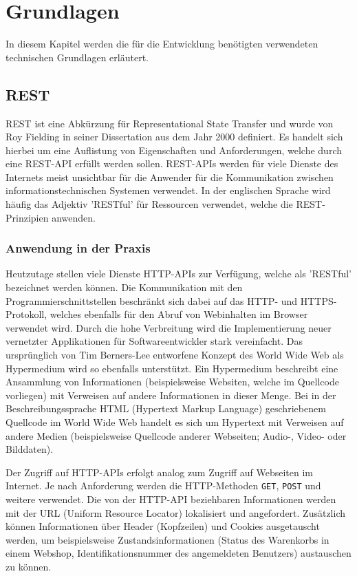 \chapter{Grundlagen}
\label{cha:grundlagen}

In diesem Kapitel werden die für die Entwicklung benötigten verwendeten technischen Grundlagen erläutert.

\section{REST}

REST ist eine Abkürzung für Representational State Transfer und wurde von Roy Fielding in seiner Dissertation aus dem Jahr 2000 \cite{rest} definiert. Es handelt sich hierbei um eine Auflistung von Eigenschaften und Anforderungen, welche durch eine REST-API erfüllt werden sollen. REST-APIs werden für viele Dienste des Internets meist unsichtbar für die Anwender für die Kommunikation zwischen informationstechnischen Systemen verwendet. In der englischen Sprache wird häufig das Adjektiv 'RESTful' für Ressourcen verwendet, welche die REST-Prinzipien anwenden.

\subsection{Anwendung in der Praxis}

Heutzutage stellen viele Dienste HTTP-APIs zur Verfügung, welche als 'RESTful' bezeichnet werden können. Die Kommunikation mit den Programmierschnittstellen beschränkt sich dabei auf das HTTP- und HTTPS-Protokoll, welches ebenfalls für den Abruf von Webinhalten im Browser verwendet wird. Durch die hohe Verbreitung wird die Implementierung neuer vernetzter Applikationen für Softwareentwickler stark vereinfacht. Das ursprünglich von Tim Berners-Lee entworfene Konzept des World Wide Web als Hypermedium wird so ebenfalls unterstützt. Ein Hypermedium beschreibt eine Ansammlung von Informationen (beispielsweise Websiten, welche im Quellcode vorliegen) mit Verweisen auf andere Informationen in dieser Menge. Bei in der Beschreibungssprache HTML (Hypertext Markup Language) geschriebenem Quellcode im World Wide Web handelt es sich um Hypertext mit Verweisen auf andere Medien (beispielsweise Quellcode anderer Webseiten; Audio-, Video- oder Bilddaten). 

Der Zugriff auf HTTP-APIs erfolgt analog zum Zugriff auf Webseiten im Internet. Je nach Anforderung werden die HTTP-Methoden \lstinline{GET}, \lstinline{POST} und weitere verwendet. Die von der HTTP-API beziehbaren Informationen werden mit der URL (Uniform Resource Locator) lokalisiert und angefordert. Zusätzlich können Informationen über Header (Kopfzeilen) und Cookies ausgetauscht werden, um beispielsweise Zustandsinformationen (Status des Warenkorbs in einem Webshop, Identifikationsnummer des angemeldeten Benutzers) austauschen zu können.


